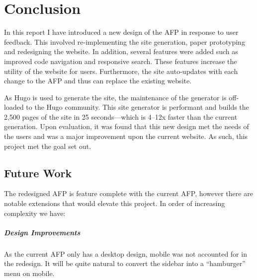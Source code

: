 \documentclass[bsc,frontabs,oneside,singlespacing,parskip,deptreport,logo]{infthesis}
\begin{document}

\chapter{Conclusion} \label{conclusion}



In this report I have introduced a new design of the AFP in response to user feedback. This involved re-implementing the site generation, paper prototyping and redesigning the website. In addition, several features were added such as improved code navigation and responsive search. These features increase the utility of the website for users. Furthermore, the site auto-updates with each change to the AFP and thus can replace the existing website.

As Hugo is used to generate the site, the maintenance of the generator is off-loaded to the Hugo community. This site generator is performant and builds the 2,500 pages of the site in 25 seconds---which is 4--12x faster than the current generation. Upon evaluation, it was found that this new design met the needs of the users and was a major improvement upon the current website. As such, this project met the goal set out.

\section{Future Work}

The redesigned AFP is feature complete with the current AFP, however there are notable extensions that would elevate this project. In order of increasing complexity we have:

\paragraph*{Design Improvements}

As the current AFP only has a desktop design, mobile was not accounted for in the redesign. It will be quite natural to convert the sidebar into a ``hamburger'' menu on mobile.
\end{document}

